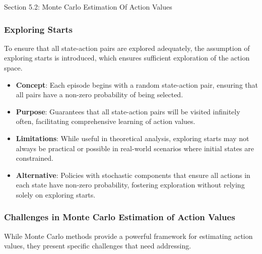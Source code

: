 \begin{notes}{Section 5.2: Monte Carlo Estimation Of Action Values}
\begin{highlight}
    \end{highlight}
    
    \subsubsection*{Exploring Starts}
    
    To ensure that all state-action pairs are explored adequately, the assumption of exploring starts is introduced, which ensures sufficient exploration of the action space.
    
    \begin{highlight}
    
        \begin{itemize}
            \item \textbf{Concept}: Each episode begins with a random state-action pair, ensuring that all pairs have a non-zero probability of being selected.
            \item \textbf{Purpose}: Guarantees that all state-action pairs will be visited infinitely often, facilitating comprehensive learning of action values.
            \item \textbf{Limitations}: While useful in theoretical analysis, exploring starts may not always be practical or possible in real-world scenarios where initial states are constrained.
            \item \textbf{Alternative}: Policies with stochastic components that ensure all actions in each state have non-zero probability, fostering exploration without relying solely on exploring starts.
        \end{itemize}
    
    \end{highlight}
    
    \subsubsection*{Challenges in Monte Carlo Estimation of Action Values}
    
    While Monte Carlo methods provide a powerful framework for estimating action values, they present specific challenges that need addressing.
    
    \begin{highlight}
    

\end{highlight}
\end{notes}
